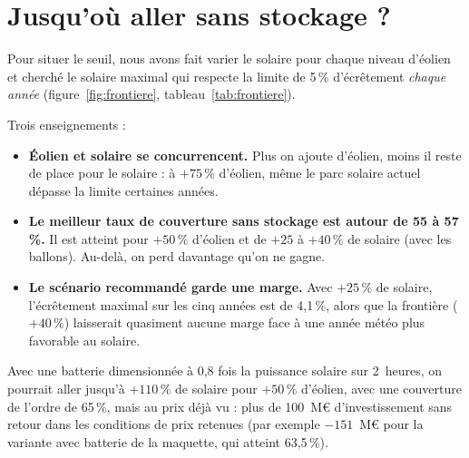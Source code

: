 \documentclass[11pt, a4paper]{report}
\newcommand{\pct}{\,\%}
\begin{document}
\section{Jusqu'où aller sans stockage ?}

Pour situer le seuil, nous avons fait varier le solaire pour chaque niveau d'éolien et cherché le solaire maximal qui respecte la limite de 5\pct{} d'écrêtement \emph{chaque année} (figure~\ref{fig:frontiere}, tableau~\ref{tab:frontiere}).



Trois enseignements :
\begin{itemize}
  \item \textbf{Éolien et solaire se concurrencent.} Plus on ajoute d'éolien, moins il reste de place pour le solaire : à $+75\pct$ d'éolien, même le parc solaire actuel dépasse la limite certaines années.
  \item \textbf{Le meilleur taux de couverture sans stockage est autour de 55 à 57\pct.} Il est atteint pour $+50\pct$ d'éolien et de $+25$ à $+40\pct$ de solaire (avec les ballons). Au-delà, on perd davantage qu'on ne gagne.
  \item \textbf{Le scénario recommandé garde une marge.} Avec $+25\pct$ de solaire, l'écrêtement maximal sur les cinq années est de 4,1\pct, alors que la frontière ($+40\pct$) laisserait quasiment aucune marge face à une année météo plus favorable au solaire.
\end{itemize}

Avec une batterie dimensionnée à 0,8 fois la puissance solaire sur 2~heures, on pourrait aller jusqu'à $+110\pct$ de solaire pour $+50\pct$ d'éolien, avec une couverture de l'ordre de 65\pct, mais au prix déjà vu : plus de 100~M\euro{} d'investissement sans retour dans les conditions de prix retenues (par exemple $-151$~M\euro{} pour la variante avec batterie de la maquette, qui atteint 63,5\pct).
\end{document}
